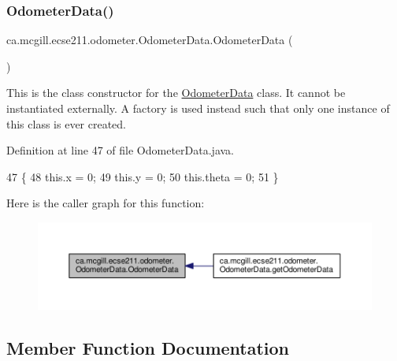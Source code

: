 \subsubsection{\texorpdfstring{Odometer\+Data()}{OdometerData()}}
{\footnotesize\ttfamily ca.\+mcgill.\+ecse211.\+odometer.\+Odometer\+Data.\+Odometer\+Data (\begin{DoxyParamCaption}{ }\end{DoxyParamCaption})\hspace{0.3cm}{\ttfamily [protected]}}

This is the class constructor for the \hyperlink{classca_1_1mcgill_1_1ecse211_1_1odometer_1_1_odometer_data}{Odometer\+Data} class. It cannot be instantiated externally. A factory is used instead such that only one instance of this class is ever created. 

Definition at line 47 of file Odometer\+Data.\+java.


\begin{DoxyCode}
47                            \{
48     this.x = 0;
49     this.y = 0;
50     this.theta = 0;
51   \}
\end{DoxyCode}
Here is the caller graph for this function\+:\nopagebreak
\begin{figure}[H]
\begin{center}
\leavevmode
\includegraphics[width=350pt]{classca_1_1mcgill_1_1ecse211_1_1odometer_1_1_odometer_data_a91412854b75c41bf3af7c8892ec0fe87_icgraph}
\end{center}
\end{figure}


\subsection{Member Function Documentation}
\mbox{\label{classca_1_1mcgill_1_1ecse211_1_1odometer_1_1_odometer_data_afff2d760dd1f861b580f3eacef37f1cc}} 
